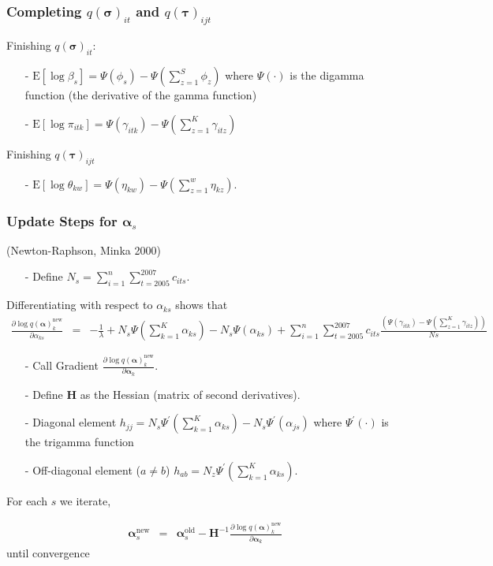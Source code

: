\documentclass{beamer}
\numberwithin{equation}{section}
\begin{document}
\begin{frame}
\frametitle{Completing $q(\boldsymbol{\sigma})_{it}$ and
$q(\boldsymbol{\tau})_{ijt}$}

Finishing $q(\boldsymbol{\sigma})_{it}$:
\begin{itemize}
\item[-] $\text{E}[\log \beta_s] = \Psi(\phi_s) -
\Psi(\sum_{z=1}^{S}\phi_{z})$ where $\Psi(\cdot)$ is the digamma
function (the derivative of the gamma function)
\item[-]  $\text{E}[\log
\pi_{itk}] =\Psi(\gamma_{itk}) - \Psi(\sum_{z=1}^{K} \gamma_{itz})$
\end{itemize}

Finishing $q(\boldsymbol{\tau})_{ijt}$
\begin{itemize}
\item[-]  $\text{E}[\log \theta_{kw}] =
\Psi(\eta_{kw} ) - \Psi(\sum_{z=1}^{w} \eta_{kz}   ) $.
\end{itemize}
\end{frame}


\begin{frame}
\frametitle{Update Steps for $\boldsymbol{\alpha}_{s}$
}(Newton-Raphson, Minka 2000)
\begin{itemize}
\item[-]  Define
$N_{s} = \sum_{i=1}^{n} \sum_{t=2005}^{2007} c_{its}$.
\end{itemize}
Differentiating with respect to $\alpha_{ks}$ shows that \scriptsize
\begin{eqnarray}
\frac{\partial \log
q(\boldsymbol{\alpha})_{k}^{\text{new}}}{\partial \alpha_{ks} } & =
& - \frac{1}{\lambda} + N_{s} \Psi(\sum_{k=1}^{K} \alpha_{ks} ) -
N_{s} \Psi(\alpha_{ks}) + \sum_{i=1}^{n} \sum_{t=2005}^{2007}
c_{its} \frac{\left(\Psi(\gamma_{itk}) - \Psi(\sum_{z=1}^{K}
\gamma_{itz} )   \right)}{N{s}} \nonumber
\end{eqnarray}
\normalsize

\begin{itemize}
\item[-] Call Gradient $\frac{\partial \log
q(\boldsymbol{\alpha})_{k}^{\text{new}}}{\partial
\boldsymbol{\alpha}_k}$.
\item[-] Define $\boldsymbol{\text{H}}$ as the Hessian (matrix of second
derivatives).

\item[-] Diagonal element $h_{jj} = N_{s}
\Psi^{'} (\sum_{k=1}^{K} \alpha_{ks}  ) - N_{s} \Psi^{'}
(\alpha_{js} ) $ where $\Psi^{'} (\cdot)$ is the trigamma function
\item[-] Off-diagonal element ($a \neq b$)
$h_{ab} = N_{z} \Psi^{'} (\sum_{k=1}^{K} \alpha_{ks})$.
\end{itemize}

 For each $s$
we iterate,

\scriptsize
\begin{eqnarray}
\boldsymbol{\alpha}_{s}^{\text{new}} & = &
\boldsymbol{\alpha}^{\text{old}}_{s} -
\boldsymbol{\text{H}}^{-1}\frac{\partial \log
q(\boldsymbol{\alpha})_{k}^{\text{new}}}{\partial
\boldsymbol{\alpha}_k} \nonumber
\end{eqnarray}
\normalsize until convergence
\end{frame}
\end{document}
